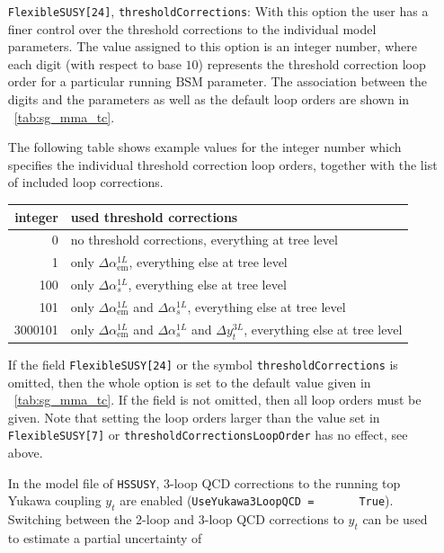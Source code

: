 \documentclass[final,3p,11pt,pdflatex]{elsarticle}
\makeatletter
\newcommand{\modelname}[1]{\texttt{#1}\@\xspace}
\newcommand{\HSSUSY}{\modelname{HSSUSY}}
\newcommand{\code}[1]{\lstinline|#1|}  %
\newcommand{\BSM}{\ensuremath{\text{BSM}}\xspace}
\newcommand{\tabref}[1]{\tablename~\ref{#1}}
\def\as{\alpha_s}
\def\aem{\alpha_{\text{em}}}
\makeatother
\begin{document}
\begin{itemize}
\item[\texttt{FlexibleSUSY[24]},] \texttt{thresholdCorrections}: With
  this option the user has a finer control over the threshold
  corrections to the individual model parameters.  The value assigned
  to this option is an integer number, where each digit (with respect to base
  $10$) represents the threshold correction loop order for a
  particular running \BSM parameter.  The association between the
  digits and the parameters as well as the default loop orders are
  shown in \tabref{tab:sg_mma_tc}.
  \begin{example}
    The following table shows example values for the integer number
    which specifies the individual threshold correction loop orders,
    together with the list of included loop corrections.
    \begin{center}
    \begin{tabular}{rl}
      \toprule
      integer & used threshold corrections \\
      \midrule
      0       & no threshold corrections, everything at tree level \\
      1       & only $\Delta\aem^{1L}$, everything else at tree level \\
      100     & only $\Delta\as^{1L}$, everything else at tree level \\
      101     & only $\Delta\aem^{1L}$ and  $\Delta\as^{1L}$, everything else at tree level \\
      3000101 & only $\Delta\aem^{1L}$ and  $\Delta\as^{1L}$ and  $\Delta y_t^{3L}$, everything else at tree level \\
      \bottomrule
    \end{tabular}
  \end{center}
  \end{example}
  If the field \texttt{FlexibleSUSY[24]} or the symbol
  \texttt{thresholdCorrections} is omitted, then the whole option is
  set to the default value given in \tabref{tab:sg_mma_tc}.  If the
  field is not omitted, then all loop orders must be given.  Note
  that setting the loop orders larger than the value set in
  \texttt{FlexibleSUSY[7]} or \texttt{thresholdCorrectionsLoopOrder}
  has no effect, see above.
  \begin{example}[label=ex:HSSUSY_thresholds]
    In the model file of \HSSUSY, 3-loop QCD corrections to the running
    top Yukawa coupling $y_t$ are enabled (\code{UseYukawa3LoopQCD =
      True}).  Switching between the 2-loop and 3-loop QCD corrections
    to $y_t$ can be used to estimate a partial uncertainty of

\end{example}
\end{itemize}
\end{document}

